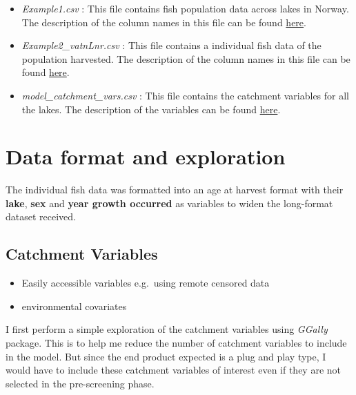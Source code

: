 \documentclass[
]{article}
\begin{document}
\begin{itemize}
\item
  \emph{Example1.csv} : This file contains fish population data across
  lakes in Norway. The description of the column names in this file can
  be found
  \href{https://github.com/Peprah94/fishyIPMs/blob/main/dataset/Variable\%20description.docx}{here}.
\item
  \emph{Example2\_vatnLnr.csv} : This file contains a individual fish
  data of the population harvested. The description of the column names
  in this file can be found
  \href{https://github.com/Peprah94/fishyIPMs/blob/main/dataset/Variable\%20description.docx}{here}.
\item
  \emph{model\_catchment\_vars.csv} : This file contains the catchment
  variables for all the lakes. The description of the variables can be
  found
  \href{https://github.com/Peprah94/fishyIPMs/blob/main/meetingScripts/Description\%20of\%20catchment\%20variables\%20.pdf}{here}.
\end{itemize}

\hypertarget{data-format-and-exploration}{%
\section{Data format and
exploration}\label{data-format-and-exploration}}

The individual fish data was formatted into an age at harvest format
with their \textbf{lake}, \textbf{sex} and \textbf{year growth occurred}
as variables to widen the long-format dataset received.

\hypertarget{catchment-variables}{%
\subsection{Catchment Variables}\label{catchment-variables}}

\begin{itemize}
\item
  Easily accessible variables e.g.~using remote censored data
\item
  environmental covariates
\end{itemize}

I first perform a simple exploration of the catchment variables using
\emph{GGally} package. This is to help me reduce the number of catchment
variables to include in the model. But since the end product expected is
a plug and play type, I would have to include these catchment variables
of interest even if they are not selected in the pre-screening phase.
\end{document}
